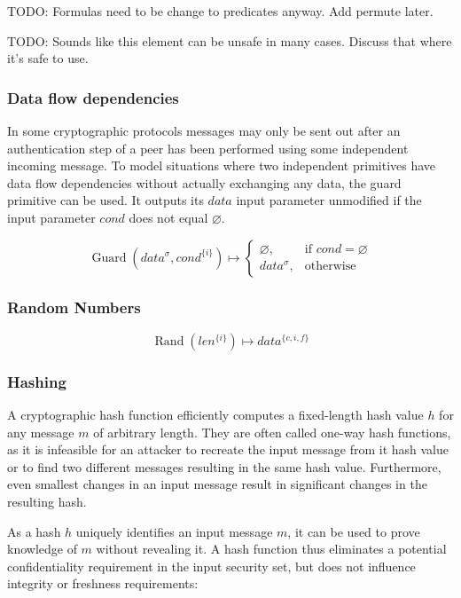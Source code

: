 \documentclass[a4paper]{article}
\DeclareMathOperator{\rand}{Rand}
\DeclareMathOperator{\guard}{Guard}
\newcommand{\TODO}[1]{\small\noindent\color{red} TODO: #1\color{black}}
\newcommand{\emptysec}{\varnothing}
\begin{document}
\TODO{Formulas need to be change to predicates anyway. Add permute later.}

\TODO{Sounds like this element can be unsafe in many cases. Discuss that where it's safe to use.}

\subsubsection{Data flow dependencies}

In some cryptographic protocols messages may only be sent out after an
authentication step of a peer has been performed using some independent
incoming message. To model situations where two independent primitives have
data flow dependencies without actually exchanging any data, the guard
primitive can be used. It outputs its $data$ input parameter unmodified if the
input parameter $cond$ does not equal $\emptysec$. 

\begin{equation*}
\guard(data^{\sigma}, cond^{\{i\}}) \mapsto
    \begin{cases}
        \emptysec,      & \text{if $cond = \emptysec$} \\
        data^{\sigma},  & \text{otherwise}
    \end{cases}
\end{equation*}

\subsubsection{Random Numbers}

$$\rand(len^{\{i\}}) \mapsto data^{\{c,i,f\}}$$

\subsubsection{Hashing}

A cryptographic hash function efficiently computes a fixed-length hash value
$h$ for any message $m$ of arbitrary length. They are often called one-way hash
functions, as it is infeasible for an attacker to recreate the input message
from it hash value or to find two different messages resulting in the same hash
value. Furthermore, even smallest changes in an input message result in
significant changes in the resulting hash.

As a hash $h$ uniquely identifies an input message $m$, it can be used to prove
knowledge of $m$ without revealing it. A hash function thus eliminates a
potential confidentiality requirement in the input security set, but does not
influence integrity or freshness requirements:
\end{document}
